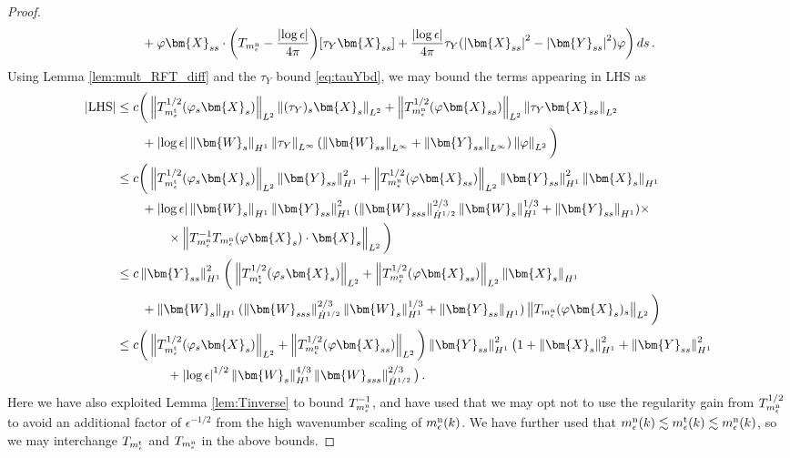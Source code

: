 \documentclass[11pt,reqno]{amsart}
\newcommand{\X}{\bm{X}}
\newcommand{\Y}{\bm{Y}}
\newcommand{\abs}[1]{\left\lvert #1 \right\rvert}
\newcommand{\norm}[1]{\left\lVert #1 \right\rVert}
\numberwithin{equation}{section}
\theoremstyle{definition}
\begin{document}
\begin{proof}
\begin{equation}
\begin{aligned}
  &\quad+ \varphi\X_{ss}\cdot\bigg(T_{m_\epsilon^{\rm n}} -\frac{\abs{\log\epsilon}}{4\pi}\bigg)[\tau_Y\X_{ss}]  + \frac{\abs{\log\epsilon}}{4\pi}\tau_Y(\abs{\X_{ss}}^2-\abs{\Y_{ss}}^2)\varphi \bigg)\,ds \,.
\end{aligned}
\end{equation}
%
%
Using Lemma \ref{lem:mult_RFT_diff} and the $\tau_Y$ bound \eqref{eq:tauYbd}, we may bound the terms appearing in LHS as 
\begin{equation}\label{eq:LHS_diffbd}
\begin{aligned}
  \abs{{\rm LHS}} &\le c\bigg( \norm{T_{m_\epsilon^{\rm t}}^{1/2}(\varphi_s\X_s)}_{L^2}\norm{(\tau_Y)_s\X_s}_{L^2} + 
  \norm{T_{m_\epsilon^{\rm n}}^{1/2}(\varphi\X_{ss})}_{L^2}\norm{\tau_Y\X_{ss}}_{L^2}\\
  &\qquad + \abs{\log\epsilon}\norm{\bm{W}_s}_{H^1}\norm{\tau_Y}_{L^\infty}(\norm{\bm{W}_{ss}}_{L^\infty}+\norm{\Y_{ss}}_{L^\infty})\norm{\varphi}_{L^2} \bigg) \\
  &\le c\bigg( \norm{T_{m_\epsilon^{\rm t}}^{1/2}(\varphi_s\X_s)}_{L^2}\norm{\Y_{ss}}_{H^1}^2 + 
  \norm{T_{m_\epsilon^{\rm n}}^{1/2}(\varphi\X_{ss})}_{L^2}\norm{\Y_{ss}}_{H^1}^2\norm{\X_s}_{H^1}\\
  &\qquad + \abs{\log\epsilon}\norm{\bm{W}_s}_{H^1}\norm{\Y_{ss}}_{H^1}^2(\norm{\bm{W}_{sss}}_{\dot H^{1/2}}^{2/3}\norm{\bm{W}_s}_{H^1}^{1/3}+\norm{\Y_{ss}}_{H^1})\times\\
  &\qquad\qquad\times\norm{T_{m_\epsilon^{\rm n}}^{-1}T_{m_\epsilon^{\rm n}}(\varphi \X_s)\cdot\X_s}_{L^2} \bigg)  \\
  &\le c\norm{\Y_{ss}}_{H^1}^2\bigg( \norm{T_{m_\epsilon^{\rm t}}^{1/2}(\varphi_s\X_s)}_{L^2} + 
  \norm{T_{m_\epsilon^{\rm n}}^{1/2}(\varphi\X_{ss})}_{L^2}\norm{\X_s}_{H^1}\\
  &\qquad + \norm{\bm{W}_s}_{H^1}(\norm{\bm{W}_{sss}}_{\dot H^{1/2}}^{2/3}\norm{\bm{W}_s}_{H^1}^{1/3}+\norm{\Y_{ss}}_{H^1})\norm{T_{m_\epsilon^{\rm n}}(\varphi \X_s)_s}_{L^2} \bigg) \\
  &\le c\bigg( \norm{T_{m_\epsilon^{\rm t}}^{1/2}(\varphi_s\X_s)}_{L^2} + 
  \norm{T_{m_\epsilon^{\rm n}}^{1/2}(\varphi\X_{ss})}_{L^2}\bigg)\norm{\Y_{ss}}_{H^1}^2\big(1 + \norm{\X_s}_{H^1}^2 + \norm{\Y_{ss}}_{H^1}^2 \\
  &\qquad\qquad + \abs{\log\epsilon}^{1/2}\norm{\bm{W}_s}_{H^1}^{4/3}\norm{\bm{W}_{sss}}_{\dot H^{1/2}}^{2/3}\big)\,.
\end{aligned}
\end{equation}
Here we have also exploited Lemma \ref{lem:Tinverse} to bound $T_{m_\epsilon^{\rm n}}^{-1}$, and have used that we may opt not to use the regularity gain from $T_{m_\epsilon^{\rm n}}^{1/2}$ to avoid an additional factor of $\epsilon^{-1/2}$ from the high wavenumber scaling of $m_\epsilon^{\rm n}(k)$. We have further used that $m_\epsilon^{\rm n}(k)\lesssim m_\epsilon^{\rm t}(k)\lesssim m_\epsilon^{\rm n}(k)$, so we may interchange $T_{m_\epsilon^{\rm t}}$ and $T_{m_\epsilon^{\rm n}}$ in the above bounds. 




\end{proof}
\end{document}
